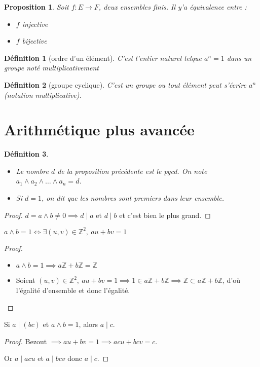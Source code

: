 \documentclass[french]{article}
\newtheorem{definition}{Définition}
\newtheorem{proposition}{Proposition}
\newcommand{\Z}{\mathbb{Z}}
\begin{document}
  \begin{proposition}
    Soit $f:E\to F$, deux ensembles finis. Il y'a équivalence entre :
    \begin{itemize}
      \item $f$ injective
      \item $f$ bijective
    \end{itemize}
  \end{proposition}
  \begin{definition}[ordre d'un élément]
    C'est l'entier naturel telque $a^n = 1$ dans un groupe noté
    multiplicativement
  \end{definition}
  \begin{definition}[groupe cyclique]
    C'est un groupe ou tout élément peut s'écrire $a^n$ (notation
    multiplicative).
  \end{definition}

\section{Arithmétique plus avancée}

  \begin{definition}
    \begin{itemize}
      \item Le nombre $d$ de la proposition précédente est le
        \emph{pgcd}. On note $a_1 \wedge a_2 \wedge … \wedge a_n = d$.
      \item Si $d=1$, on dit que les nombres sont premiers dans leur
        ensemble.
    \end{itemize}
  \end{definition}
  \begin{proof}
    $d=a\wedge b \neq 0 \implies d\mid a$ et $d\mid b$ et c'est bien le
    plus grand.
  \end{proof}

  \begin{theorem}[Bezout]
    $a\wedge b = 1 \iff \exists (u,v)\in\Z^2,\ au+bv = 1$
  \end{theorem}
  \begin{proof}
    \begin{itemize}
      \item $a\wedge b = 1 \implies a\Z + b\Z = \Z$
      \item Soient $(u,v)\in\Z^2,\ au+bv = 1 \implies 1\in a\Z + b\Z
        \implies \Z\subset a\Z + b\Z$, d'où l'égalité d'ensemble et donc
        l'égalité.
    \end{itemize}
  \end{proof}
  \begin{theorem}[Gauss]
    Si $a\mid(bc)$ et $a\wedge b = 1$, alors $a\mid c$.
  \end{theorem}
  \begin{proof}
    Bezout $\implies au + bv = 1 \implies acu + bcv = c$.

    Or $a\mid acu$ et $a\mid bcv$ donc $a\mid c$.
  \end{proof}
\end{document}
